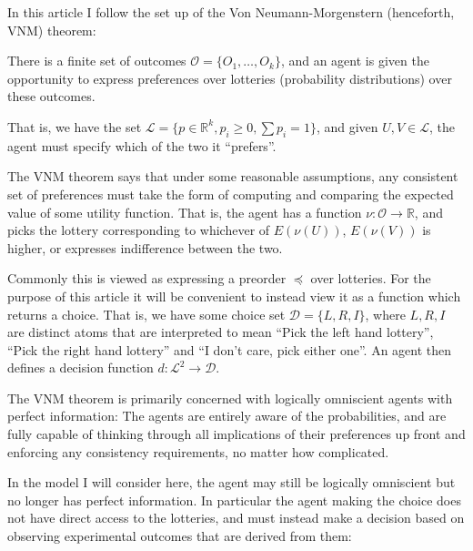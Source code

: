 In this article I follow the set up of the Von Neumann-Morgenstern (henceforth,
VNM) theorem:

There is a finite set of outcomes $\mathcal{O} = \{O_1, \ldots, O_k\}$, and
an agent is given the opportunity to express preferences over lotteries (probability
distributions) over these outcomes.

That is, we have the set $\mathcal{L} = \{p \in \mathbb{R}^k, p_i \geq 0, \sum p_i = 1\}$,
and given \(U, V \in \mathcal{L}\), the agent must specify which of the two
it ``prefers''.

The VNM theorem says that under some reasonable assumptions,
any consistent set of preferences must take the form of computing and comparing
the expected value of some utility function. That is, the agent has a function
$\nu : \mathcal{O} \to \mathbb{R}$, and picks the lottery corresponding to whichever
of $E(\nu(U))$, $E(\nu(V))$ is higher, or expresses indifference between the two.

Commonly this is viewed as expressing a preorder $\preceq$ over lotteries. For
the purpose of this article it will be convenient to instead view it as a function
which returns a choice. That is, we have some choice set $\mathcal{D} = \{L, R, I\}$,
where $L, R, I$ are distinct atoms that are interpreted to mean ``Pick the left hand lottery'',
``Pick the right hand lottery'' and ``I don't care, pick either one''. An agent
then defines a decision function $d: \mathcal{L}^2 \to \mathcal{D}$.

The VNM theorem is primarily concerned with logically omniscient agents with
perfect information: The agents are entirely aware of the probabilities, and are
fully capable of thinking through all implications of their preferences up front
and enforcing any consistency requirements, no matter how complicated.

In the model I will consider here, the agent may still be logically omniscient
but no longer has perfect information. In particular the agent making the choice
does not have direct access to the lotteries, and must instead make a decision based on
observing experimental outcomes that are derived from them:

